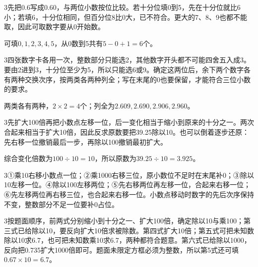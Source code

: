 \documentclass[multi=snippet,border={5bp 20bp 5bp 5bp}]{standalone}
\newenvironment{snippet}[3]{\begin{minipage}{#1bp}\color{answerred}\fontsize{#2}{#3}\selectfont\raggedright}{\end{minipage}}
\begin{document}
\begin{snippet}{505}{11.5}{14}\begin{multicols}{3}\raggedcolumns 先把0.6写成0.60，与两位小数按位比较。若十分位填0到5，先在十分位就比6小；若填6，十分位相同，但百分位8比0大，已不符合。更大的7、8、9也都不能取，因此可取数字要从0开始数。\par 可填\(0,\allowbreak 1,\allowbreak 2,\allowbreak 3,\allowbreak 4,\allowbreak 5\)\allowbreak ，从0数到5共有\(5-0+1=6\)\allowbreak 个。\end{multicols}\end{snippet}
\begin{snippet}{505}{11.5}{14}\begin{multicols}{3}\raggedcolumns 四张数字卡各用一次，整数部分只能选2，其他数字开头都不可能四舍五入成3。要由2进到3，十分位至少为5，所以只能选6或9。确定这两位后，余下两个数字各有两种交换次序，按两类各两种列全；写在末尾的0也要保留，才能符合三位小数的要求。\par 两类各有两种，\(2\times2=4\)\allowbreak 个；列全为\(2.609,\allowbreak 2.690,\allowbreak 2.906,\allowbreak 2.960\)\allowbreak 。\end{multicols}\end{snippet}
\begin{snippet}{505}{11.5}{14}\begin{multicols}{3}\raggedcolumns 先扩大100倍再把小数点左移一位，后一变化相当于缩小到原来的十分之一。两次合起来相当于扩大10倍，因此反求原数要把39.25除以10。也可以倒着逐步还原：先右移一位撤销最后一步，再除以100撤销最初扩大。\par 综合变化倍数为\(100\div10=10\)\allowbreak ，所以原数为\(39.25\div10=3.925\)\allowbreak 。\end{multicols}\end{snippet}
\begin{snippet}{505}{11.5}{14}\begin{multicols}{3}\raggedcolumns ①乘10右移小数点一位；②乘1000右移三位，原小数位不足时在末尾补0；③除以10左移一位。④除以100左移两位；⑤先右移两位再左移一位，合起来右移一位；⑥先左移两位再右移三位，也合起来右移一位。小数点移动时数字的先后次序保持不变，整数部分不足一位要补0占位。\end{multicols}\end{snippet}
\begin{snippet}{505}{11.5}{14}\begin{multicols}{3}\raggedcolumns 按题面顺序，前两式分别缩小到十分之一、扩大100倍，确定除以10与乘100；第三式已给除以10，要反向扩大10倍求被除数。第四式扩大10倍；第五式可把未知数除以10求6.7，也可把未知数乘10求6.7，两种都符合题意。第六式已给除以1000，反向把0.735扩大1000倍即可。题面未限定方框必须为整数，所以第5式还可填\(0.67\times10=6.7\)\allowbreak 。\end{multicols}\end{snippet}
\end{document}
